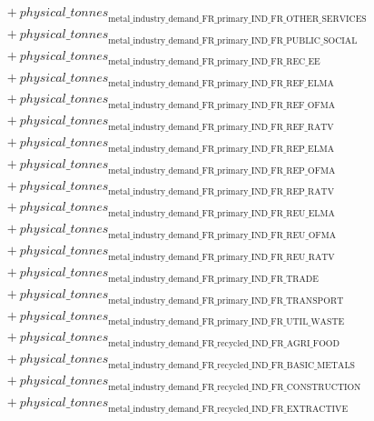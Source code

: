\documentclass[11pt]{article}
\begin{document}
\begin{align*}
&\quad {}+ {physical\_tonnes}_{\text{metal\_industry\_demand\_FR\_primary\_IND\_FR\_OTHER\_SERVICES}}\\
&\quad {}+ {physical\_tonnes}_{\text{metal\_industry\_demand\_FR\_primary\_IND\_FR\_PUBLIC\_SOCIAL}}\\
&\quad {}+ {physical\_tonnes}_{\text{metal\_industry\_demand\_FR\_primary\_IND\_FR\_REC\_EE}}\\
&\quad {}+ {physical\_tonnes}_{\text{metal\_industry\_demand\_FR\_primary\_IND\_FR\_REF\_ELMA}}\\
&\quad {}+ {physical\_tonnes}_{\text{metal\_industry\_demand\_FR\_primary\_IND\_FR\_REF\_OFMA}}\\
&\quad {}+ {physical\_tonnes}_{\text{metal\_industry\_demand\_FR\_primary\_IND\_FR\_REF\_RATV}}\\
&\quad {}+ {physical\_tonnes}_{\text{metal\_industry\_demand\_FR\_primary\_IND\_FR\_REP\_ELMA}}\\
&\quad {}+ {physical\_tonnes}_{\text{metal\_industry\_demand\_FR\_primary\_IND\_FR\_REP\_OFMA}}\\
&\quad {}+ {physical\_tonnes}_{\text{metal\_industry\_demand\_FR\_primary\_IND\_FR\_REP\_RATV}}\\
&\quad {}+ {physical\_tonnes}_{\text{metal\_industry\_demand\_FR\_primary\_IND\_FR\_REU\_ELMA}}\\
&\quad {}+ {physical\_tonnes}_{\text{metal\_industry\_demand\_FR\_primary\_IND\_FR\_REU\_OFMA}}\\
&\quad {}+ {physical\_tonnes}_{\text{metal\_industry\_demand\_FR\_primary\_IND\_FR\_REU\_RATV}}\\
&\quad {}+ {physical\_tonnes}_{\text{metal\_industry\_demand\_FR\_primary\_IND\_FR\_TRADE}}\\
&\quad {}+ {physical\_tonnes}_{\text{metal\_industry\_demand\_FR\_primary\_IND\_FR\_TRANSPORT}}\\
&\quad {}+ {physical\_tonnes}_{\text{metal\_industry\_demand\_FR\_primary\_IND\_FR\_UTIL\_WASTE}}\\
&\quad {}+ {physical\_tonnes}_{\text{metal\_industry\_demand\_FR\_recycled\_IND\_FR\_AGRI\_FOOD}}\\
&\quad {}+ {physical\_tonnes}_{\text{metal\_industry\_demand\_FR\_recycled\_IND\_FR\_BASIC\_METALS}}\\
&\quad {}+ {physical\_tonnes}_{\text{metal\_industry\_demand\_FR\_recycled\_IND\_FR\_CONSTRUCTION}}\\
&\quad {}+ {physical\_tonnes}_{\text{metal\_industry\_demand\_FR\_recycled\_IND\_FR\_EXTRACTIVE}}\\

\end{align*}
\end{document}
